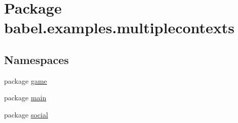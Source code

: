 \hypertarget{namespacebabel_1_1examples_1_1multiplecontexts}{\section{Package babel.\-examples.\-multiplecontexts}
\label{namespacebabel_1_1examples_1_1multiplecontexts}
}
\subsection*{Namespaces}
\begin{DoxyCompactItemize}
\item 
package \hyperlink{namespacebabel_1_1examples_1_1multiplecontexts_1_1game}{game}
\item 
package \hyperlink{namespacebabel_1_1examples_1_1multiplecontexts_1_1main}{main}
\item 
package \hyperlink{namespacebabel_1_1examples_1_1multiplecontexts_1_1social}{social}
\end{DoxyCompactItemize}
